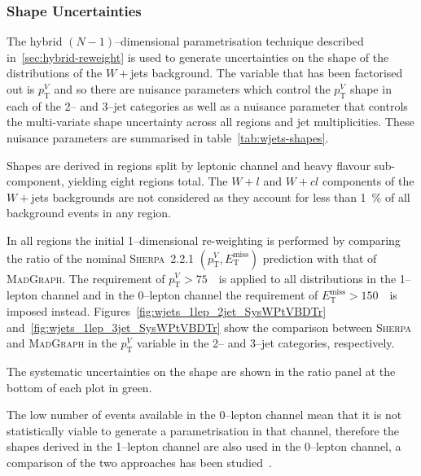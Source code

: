 \subsubsection{Shape Uncertainties}

The hybrid $(N-1)$--dimensional parametrisation technique described
in~\ref{sec:hybrid-reweight} is used to generate uncertainties on the shape of
the distributions of the $W+$jets background. The variable that has been
factorised out is $p_{\mathrm{T}}^V$ and so there are nuisance parameters which
control the $p_{\mathrm{T}}^V$ shape in each of the 2-- and 3--jet categories as
well as a nuisance parameter that controls the multi-variate shape uncertainty
across all regions and jet multiplicities. These nuisance parameters are
summarised in table~\ref{tab:wjets-shapes}.


Shapes are derived in regions split by leptonic channel and heavy flavour
sub-component, yielding eight regions total. The $W+l$ and $W+cl$ components of
the $W+$jets backgrounds are not considered as they account for less than 1~\%
of all background events in any region.

In all regions the initial 1--dimensional re-weighting is performed by comparing
the ratio of the nominal \textsc{Sherpa}~2.2.1 $(p_{\mathrm{T}}^V,
E_{\mathrm{T}}^{\text{miss}})$ prediction with that of \textsc{MadGraph}. The
requirement of $p_{\mathrm{T}}^V>75$~\GeV\ is applied to all distributions in
the 1--lepton channel and in the 0--lepton channel the requirement of
$E_{\mathrm{T}}^{\text{miss}}>150$~\GeV\ is imposed instead.
Figures~\ref{fig:wjets_1lep_2jet_SysWPtVBDTr}
and~\ref{fig:wjets_1lep_3jet_SysWPtVBDTr} show the comparison between
\textsc{Sherpa} and \textsc{MadGraph} in the  $p_{\mathrm{T}}^V$ variable in the
2-- and 3--jet categories, respectively.

The systematic uncertainties on the shape are shown in the ratio panel at the
bottom of each plot in green.

The low number of events available in the 0--lepton channel mean that it is not
statistically viable to generate a parametrisation in that channel, therefore
the shapes derived in the 1--lepton channel are also used in the 0--lepton
channel, a comparison of the two approaches has been
studied~\cite{VHModellingNote2019}.

